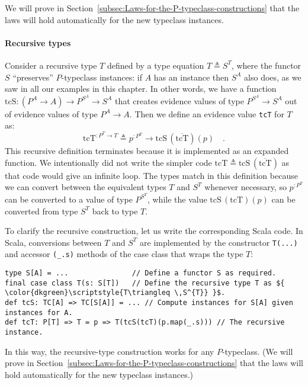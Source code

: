 We will prove in Section~\ref{subsec:Laws-for-the-P-typeclass-constructions}
that the laws will hold automatically for the new typeclass instances.

\paragraph{Recursive types}

Consider a recursive type $T$ defined by a type equation $T\triangleq S^{T}$,
where the functor $S$ \textsf{``}preserves\textsf{''} $P$-typeclass instances: if
$A$ has an instance then $S^{A}$ also does, as we saw in all our
examples in this chapter. In other words, we have a function $\text{tcS}:(P^{A}\rightarrow A)\rightarrow P^{S^{A}}\rightarrow S^{A}$
that creates evidence values of type $P^{S^{A}}\rightarrow S^{A}$
out of evidence values of type $P^{A}\rightarrow A$. Then we define
an evidence value \lstinline!tcT! for $T$ as:
\[
\text{tcT}^{:P^{T}\rightarrow T}\triangleq p^{:P^{T}}\rightarrow\text{tcS}\,(\overline{\text{tcT}})(p)\quad.
\]
This recursive definition terminates because it is implemented as
an expanded function. We intentionally did not write the simpler code
$\text{tcT}\triangleq\text{tcS}\,(\overline{\text{tcT}})$ as that
code would give an infinite loop. The types match in this definition
because we can convert between the equivalent types $T$ and $S^{T}$
whenever necessary, so $p^{:P^{T}}$ can be converted to a value of
type $P^{S^{T}}$, while the value $\text{tcS}\,(\text{tcT})(p)$
can be converted from type $S^{T}$ back to type $T$.

To clarify the recursive construction, let us write the corresponding
Scala code. In Scala, conversions between $T$ and $S^{T}$ are implemented
by the constructor \lstinline!T(...)! and accessor \lstinline!(_.s)!
methods of the case class that wraps the type $T$:
\begin{lstlisting}[mathescape=true]
type S[A] = ...               // Define a functor S as required.
final case class T(s: S[T])   // Define the recursive type T as ${ \color{dkgreen}\scriptstyle{T\triangleq \,S^{T}} }$.
def tcS: TC[A] => TC[S[A]] = ... // Compute instances for S[A] given instances for A.
def tcT: P[T] => T = p => T(tcS(tcT)(p.map(_.s))) // The recursive instance.
\end{lstlisting}
In this way, the recursive-type construction works for any $P$-typeclass.
(We will prove in Section~\ref{subsec:Laws-for-the-P-typeclass-constructions}
that the laws will hold automatically for the new typeclass instances.)

